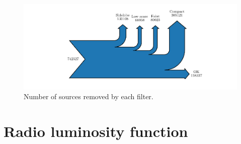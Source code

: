     \begin{figure}
        \centering
        \includegraphics{rlf-images/sankey_sources.pdf}
        \caption{\label{fig:sankey-sources} Number of sources removed by each filter.}
    \end{figure}

\section{Radio luminosity function}
\label{sec:rlfs-rlf-desc}

